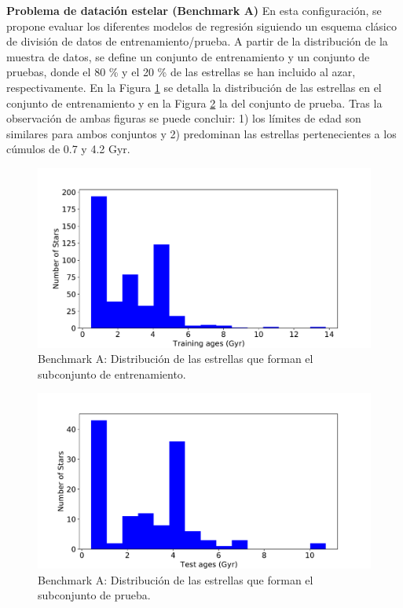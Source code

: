 \textbf{Problema de datación estelar (Benchmark A)} {} En esta configuración, se propone evaluar los diferentes modelos de regresión siguiendo un esquema clásico de división de datos de entrenamiento/prueba. A partir de la distribución de la muestra de datos, se define un conjunto de entrenamiento y un conjunto de pruebas, donde el  80 \% y el 20 \% de las estrellas se han incluido al azar, respectivamente. En la Figura \ref{fig:benchA_train} se detalla la distribución de las estrellas en el conjunto de entrenamiento y en la Figura \ref{fig:benchA_test} la del conjunto de prueba. Tras la observación de ambas figuras se puede concluir: 1) los límites de edad son similares para ambos conjuntos y 2) predominan las estrellas pertenecientes a los cúmulos de 0.7 y 4.2 Gyr. 

\begin{figure}[H]
\begin{center}
 \includegraphics[width=0.8\linewidth]{Figuras/Experimentos/B_A_training.pdf}
\end{center}
\caption{Benchmark A: Distribución de las estrellas que forman el subconjunto de entrenamiento.}
 \label{fig:benchA_train}
\end{figure}

\begin{figure}[H]
\begin{center}
 \includegraphics[width=0.8\linewidth]{Figuras/Experimentos/B_A_test.pdf}
\end{center}
\caption{Benchmark A: Distribución de las estrellas que forman el subconjunto de prueba.}
 \label{fig:benchA_test}
\end{figure}


